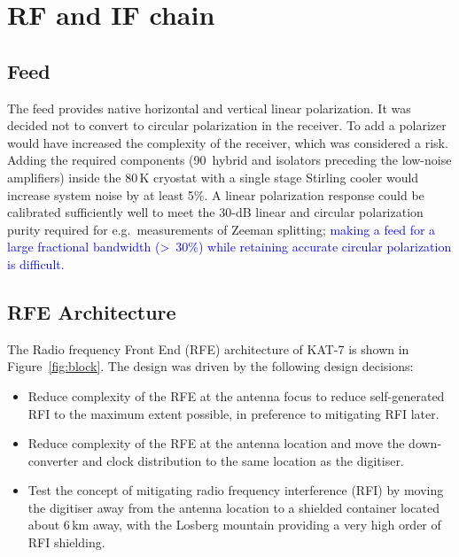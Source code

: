 \section{RF and IF chain}
\label{sec:RF}

\subsection{Feed}

\noindent
The feed provides native horizontal and vertical linear
polarization. It was decided not to convert to circular polarization
in the receiver. To add a polarizer would have increased the
complexity of the receiver, which was considered a risk. Adding the
required components (90\degr\ hybrid and isolators preceding the
low-noise amplifiers) inside the 80\,K cryostat with a single stage
Stirling cooler would increase system noise by at least 5\%.  A linear
polarization response could be calibrated sufficiently well to meet
the 30-dB linear and circular polarization purity required for
e.g.~measurements of Zeeman splitting; \textcolor{blue}{making
  a feed for a large fractional bandwidth (\textgreater~30\%) while
  retaining accurate circular polarization is difficult.}

\subsection {RFE Architecture}

\noindent
The Radio frequency Front End (RFE) architecture of KAT-7 is shown in 
Figure~\ref{fig:block}.
The design was driven by the following design decisions:

\begin{itemize}
\item Reduce complexity of the RFE at the antenna focus to reduce
  self-generated RFI to the maximum extent possible, in preference to
  mitigating RFI later.
\item Reduce complexity of the RFE at the antenna location and move
  the down-converter and clock distribution to the same location as
  the digitiser.
\item Test the concept of mitigating radio frequency interference
  (RFI) by moving the digitiser away from the antenna location to a
  shielded container located about 6\,km away, with the Losberg
  mountain providing a very high order of RFI shielding.
\end{itemize}  




